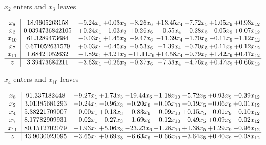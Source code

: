 \documentclass[8pt]{article}
\begin{document}
 $ x_{2} $ enters and $ x_{3} $ leaves 

 \[\begin{array}{c| c c@{\hskip 2pt} c@{\hskip 2pt} c@{\hskip 2pt} c@{\hskip 2pt} c@{\hskip 2pt} c@{\hskip 2pt} c@{\hskip 2pt} }
 x_{8}   &  18.9605263158 & -9.24 x_{1} & +  0.03 x_{3} & -8.26 x_{6} & + 13.45 x_{4} & -7.72 x_{5} & +  1.05 x_{9} & +  0.93 x_{12}\\
 x_{2}   &  0.0394736842105 & +  0.24 x_{1} & -1.03 x_{3} & +  0.26 x_{6} & +  0.55 x_{4} & -0.28 x_{5} & -0.05 x_{9} & +  0.07 x_{12}\\
 x_{10}   &  61.3289473684 & -0.03 x_{1} & +  1.45 x_{3} & -9.47 x_{6} & -11.39 x_{4} & +  1.70 x_{5} & -0.11 x_{9} & -1.12 x_{12}\\
 x_{7}   &  0.671052631579 & +  0.03 x_{1} & -0.45 x_{3} & -0.53 x_{6} & +  1.39 x_{4} & -0.70 x_{5} & +  0.11 x_{9} & +  0.12 x_{12}\\
 x_{11}   &  1.68421052632 & -1.89 x_{1} & +  3.21 x_{3} & -11.11 x_{6} & + 14.58 x_{4} & -0.79 x_{5} & +  1.42 x_{9} & +  0.47 x_{12}\\
\hline
z    &  3.39473684211 & -3.63 x_{1} & -0.26 x_{3} & -0.37 x_{6} & +  7.53 x_{4} & -4.76 x_{5} & +  0.47 x_{9} & +  0.66 x_{12}\\
\end{array}\]


 $ x_{4} $ enters and $ x_{10} $ leaves 

 \[\begin{array}{c| c c@{\hskip 2pt} c@{\hskip 2pt} c@{\hskip 2pt} c@{\hskip 2pt} c@{\hskip 2pt} c@{\hskip 2pt} c@{\hskip 2pt} }
 x_{8}   &  91.337182448 & -9.27 x_{1} & +  1.73 x_{3} & -19.44 x_{6} & -1.18 x_{10} & -5.72 x_{5} & +  0.93 x_{9} & -0.39 x_{12}\\
 x_{2}   &  3.01385681293 & +  0.24 x_{1} & -0.96 x_{3} & -0.20 x_{6} & -0.05 x_{10} & -0.19 x_{5} & -0.06 x_{9} & +  0.01 x_{12}\\
 x_{4}   &  5.38221709007 & -0.00 x_{1} & +  0.13 x_{3} & -0.83 x_{6} & -0.09 x_{10} & +  0.15 x_{5} & -0.01 x_{9} & -0.10 x_{12}\\
 x_{7}   &  8.17782909931 & +  0.02 x_{1} & -0.27 x_{3} & -1.69 x_{6} & -0.12 x_{10} & -0.49 x_{5} & +  0.09 x_{9} & -0.02 x_{12}\\
 x_{11}   &  80.1512702079 & -1.93 x_{1} & +  5.06 x_{3} & -23.23 x_{6} & -1.28 x_{10} & +  1.38 x_{5} & +  1.29 x_{9} & -0.96 x_{12}\\
\hline
z    &  43.9030023095 & -3.65 x_{1} & +  0.69 x_{3} & -6.63 x_{6} & -0.66 x_{10} & -3.64 x_{5} & +  0.40 x_{9} & -0.08 x_{12}\\
\end{array}\]
\end{document}
